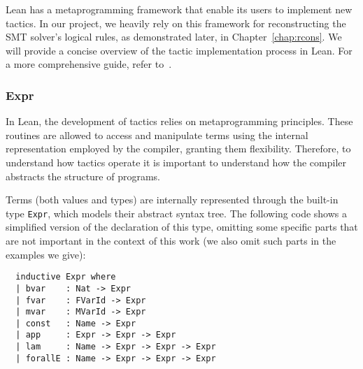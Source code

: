 Lean has a metaprogramming framework that enable its users to implement new tactics. In our project, we heavily rely on this framework for reconstructing the SMT solver's logical rules, as demonstrated later, in Chapter~\ref{chap:rcons}. We will provide a concise overview of the tactic implementation process in Lean. For a more comprehensive guide, refer to~\cite{metaLean}.

\subsubsection{Expr}

In Lean, the development of tactics relies on metaprogramming principles. These routines are allowed to access and manipulate terms using the internal representation employed by the compiler, granting them flexibility. Therefore, to understand how tactics operate it is important to understand how the compiler abstracts the structure of programs.

Terms (both values and types) are internally represented through the built-in type \texttt{Expr}, which models their abstract syntax tree. The following code shows a simplified version of the declaration of this type, omitting some specific parts that are not important in the context of this work (we also omit such parts in the examples we give):

\begin{verbatim}
  inductive Expr where
  | bvar    : Nat -> Expr
  | fvar    : FVarId -> Expr
  | mvar    : MVarId -> Expr
  | const   : Name -> Expr
  | app     : Expr -> Expr -> Expr
  | lam     : Name -> Expr -> Expr -> Expr
  | forallE : Name -> Expr -> Expr -> Expr
\end{verbatim}

